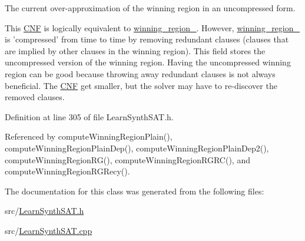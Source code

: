 The current over-\/approximation of the winning region in an uncompressed form. 

This \hyperlink{classCNF}{C\-N\-F} is logically equivalent to \hyperlink{classLearnSynthSAT_aced2bce789c7a93ed4b5391dd0690616}{winning\-\_\-region\-\_\-}. However, \hyperlink{classLearnSynthSAT_aced2bce789c7a93ed4b5391dd0690616}{winning\-\_\-region\-\_\-} is 'compressed' from time to time by removing redundant clauses (clauses that are implied by other clauses in the winning region). This field stores the uncompressed version of the winning region. Having the uncompressed winning region can be good because throwing away redundant clauses is not always beneficial. The \hyperlink{classCNF}{C\-N\-F} get smaller, but the solver may have to re-\/discover the removed clauses. 

Definition at line 305 of file Learn\-Synth\-S\-A\-T.\-h.



Referenced by compute\-Winning\-Region\-Plain(), compute\-Winning\-Region\-Plain\-Dep(), compute\-Winning\-Region\-Plain\-Dep2(), compute\-Winning\-Region\-R\-G(), compute\-Winning\-Region\-R\-G\-R\-C(), and compute\-Winning\-Region\-R\-G\-Recy().



The documentation for this class was generated from the following files\-:\begin{DoxyCompactItemize}
\item 
src/\hyperlink{LearnSynthSAT_8h}{Learn\-Synth\-S\-A\-T.\-h}\item 
src/\hyperlink{LearnSynthSAT_8cpp}{Learn\-Synth\-S\-A\-T.\-cpp}\end{DoxyCompactItemize}
